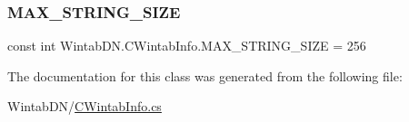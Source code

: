 \subsubsection{\texorpdfstring{M\+A\+X\+\_\+\+S\+T\+R\+I\+N\+G\+\_\+\+S\+I\+ZE}{MAX\_STRING\_SIZE}}
{\footnotesize\ttfamily const int Wintab\+D\+N.\+C\+Wintab\+Info.\+M\+A\+X\+\_\+\+S\+T\+R\+I\+N\+G\+\_\+\+S\+I\+ZE = 256\hspace{0.3cm}{\ttfamily [private]}}



The documentation for this class was generated from the following file\+:\begin{DoxyCompactItemize}
\item 
Wintab\+D\+N/\mbox{\hyperlink{_c_wintab_info_8cs}{C\+Wintab\+Info.\+cs}}\end{DoxyCompactItemize}
